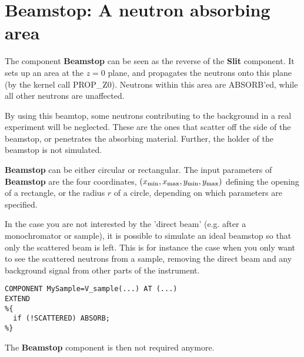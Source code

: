 \section{Beamstop: A neutron absorbing area}
\label{beamstop}


The component {\bf Beamstop} can be seen as the reverse of
the {\bf Slit} component.
It sets up an area at the $z=0$ plane, and propagates the neutrons
onto this plane (by the kernel call PROP\_Z0).
Neutrons within this area are ABSORB'ed,
while all other neutrons are unaffected.

By using this beamtop, some neutrons contributing to the background
in a real experiment will be neglected.
These are the ones that scatter off the side
of the beamstop, or penetrates the absorbing material.
Further, the holder of the beamstop is not simulated.

{\bf Beamstop} can be either circular or rectangular.
The input parameters of {\bf Beamstop} are the four coordinates,
$(x_{\rm min}, x_{\rm max}, y_{\rm min}, y_{\rm max})$
defining the opening of a rectangle, or the radius $r$ of
a circle, depending on which parameters are specified.

In the case you are not interested by the 'direct beam' (e.g. after a monochromator or sample), it is possible to simulate an ideal beamstop so that only the scattered beam is left. This is for instance the case when you only want to see the scattered neutrons from a sample, removing the direct beam and any background signal from other parts of the instrument.
\begin{verbatim}
COMPONENT MySample=V_sample(...) AT (...)
EXTEND
%{
  if (!SCATTERED) ABSORB;
%}
\end{verbatim}
The {\bf Beamstop} component is then not required anymore.